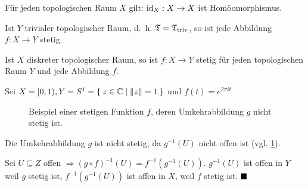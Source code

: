 \begin{beispiel}
    \begin{bspenum}
        \item Für jeden topologischen Raum $X$ gilt: $\textnormal{id}_X : X \rightarrow X$
              ist Homöomorphismus.
        \item Ist $Y$ trivialer topologischer Raum, d.~h. $\mathfrak{T} = \mathfrak{T}_\text{triv}$,
              so ist jede Abbildung $f:X \rightarrow Y$ stetig.
        \item Ist $X$ diskreter topologischer Raum, so ist $f:X \rightarrow Y$
              stetig für jeden topologischen Raum $Y$ und jede Abbildung $f$.
        \item Sei $X = [0, 1), Y = S^1 = \Set{z \in \ensuremath{\mathbb{C}}| \|z\| = 1}$
              und $f(t) = e^{2 \pi i t}$
              \begin{figure}[htp]
                \centering
                
                \caption{Beispiel einer stetigen Funktion $f$, deren 
                         Umkehrabbildung $g$ nicht stetig ist.}
                \label{fig:nicht-stetige-umkehrabbildung}
              \end{figure}
              Die Umkehrabbildung $g$ ist nicht stetig, da $g^{-1}(U)$
              nicht offen ist (vgl. \cref{fig:nicht-stetige-umkehrabbildung}).
    \end{bspenum}
\end{beispiel}


\begin{beweis}
    Sei $U \subseteq Z$ offen $\Rightarrow (g \circ f)^{-1} (U) = f^{-1} (g^{-1}(U))$.
    $g^{-1}(U)$ ist offen in $Y$ weil $g$ stetig ist, $f^{-1}(g^{-1}(U))$
    ist offen in $X$, weil $f$ stetig ist. $\qed$
\end{beweis}

